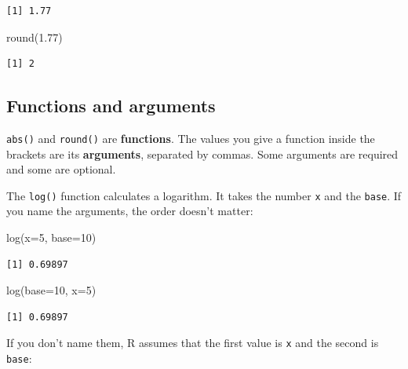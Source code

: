 \documentclass[
  letterpaper,
  DIV=11,
  numbers=noendperiod]{scrreprt}
\newenvironment{Shaded}{\begin{snugshade}}{\end{snugshade}}
\newcommand{\AttributeTok}[1]{\textcolor[rgb]{0.40,0.45,0.13}{#1}}
\newcommand{\DecValTok}[1]{\textcolor[rgb]{0.68,0.00,0.00}{#1}}
\newcommand{\FloatTok}[1]{\textcolor[rgb]{0.68,0.00,0.00}{#1}}
\newcommand{\FunctionTok}[1]{\textcolor[rgb]{0.28,0.35,0.67}{#1}}
\newcommand{\NormalTok}[1]{\textcolor[rgb]{0.00,0.23,0.31}{#1}}
\begin{document}
\begin{verbatim}
[1] 1.77
\end{verbatim}

\begin{Shaded}
\begin{Highlighting}[]
\FunctionTok{round}\NormalTok{(}\FloatTok{1.77}\NormalTok{)}
\end{Highlighting}
\end{Shaded}

\begin{verbatim}
[1] 2
\end{verbatim}

\subsection{Functions and arguments}\label{functions-and-arguments}

\texttt{abs()} and \texttt{round()} are \textbf{functions}. The values
you give a function inside the brackets are its \textbf{arguments},
separated by commas. Some arguments are required and some are optional.

The \texttt{log()} function calculates a logarithm. It takes the number
\texttt{x} and the \texttt{base}. If you name the arguments, the order
doesn't matter:

\begin{Shaded}
\begin{Highlighting}[]
\FunctionTok{log}\NormalTok{(}\AttributeTok{x=}\DecValTok{5}\NormalTok{, }\AttributeTok{base=}\DecValTok{10}\NormalTok{)}
\end{Highlighting}
\end{Shaded}

\begin{verbatim}
[1] 0.69897
\end{verbatim}

\begin{Shaded}
\begin{Highlighting}[]
\FunctionTok{log}\NormalTok{(}\AttributeTok{base=}\DecValTok{10}\NormalTok{, }\AttributeTok{x=}\DecValTok{5}\NormalTok{)}
\end{Highlighting}
\end{Shaded}

\begin{verbatim}
[1] 0.69897
\end{verbatim}

If you don't name them, R assumes that the first value is \texttt{x} and
the second is \texttt{base}:
\end{document}
